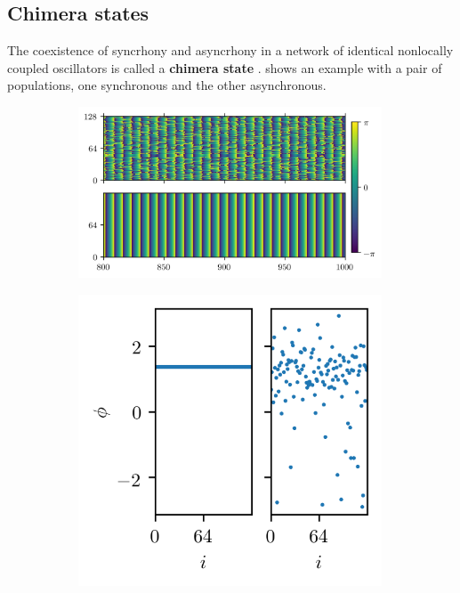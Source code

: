 \documentclass{beamer}
\begin{document}
\begin{frame}[t]
\begin{multicols}{3}
    \section{Chimera states}
    The coexistence of syncrhony and asyncrhony in a network of identical nonlocally coupled oscillators is called a \textbf{chimera state} \cite{Kuramoto2002,Abrams2004}.
     shows an example with a pair of populations, one synchronous and the other asynchronous.
    \begin{figure}
      \begin{subfigure}{0.66\columnwidth}
        \centering
        \includegraphics[width=0.99\textwidth]{figure/abrams_overhead}
        \caption{}
        \label{fig:abrams_overhead}
      \end{subfigure}%
      \begin{subfigure}{0.33\columnwidth}
        \centering
        \includegraphics[width=0.99\textwidth]{figure/abrams_snapshot}

\end{subfigure}
\end{figure}
\end{multicols}
\end{frame}
\end{document}
